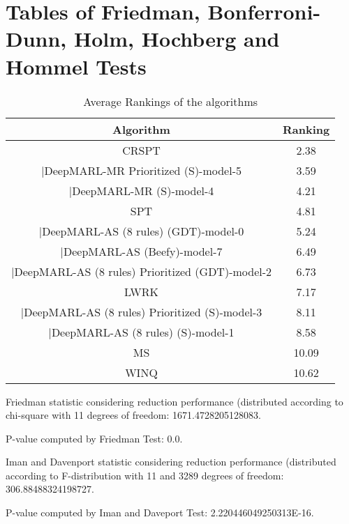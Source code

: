 \documentclass[a3paper,10pt]{article}
\author{}
\date{\today}
\begin{document}
\oddsidemargin 0in \topmargin 0in\maketitle
\section{Tables of Friedman, Bonferroni-Dunn, Holm, Hochberg and Hommel Tests}
\begin{table}[!htp]
\centering
\caption{Average Rankings of the algorithms
}\begin{tabular}{c|c}
Algorithm&Ranking\\
\hline
CRSPT&2.38\\
|DeepMARL-MR Prioritized (S)-model-5&3.59\\
|DeepMARL-MR (S)-model-4&4.21\\
SPT&4.81\\
|DeepMARL-AS (8 rules) (GDT)-model-0&5.24\\
|DeepMARL-AS (Beefy)-model-7&6.49\\
|DeepMARL-AS (8 rules) Prioritized (GDT)-model-2&6.73\\
LWRK&7.17\\
|DeepMARL-AS (8 rules) Prioritized (S)-model-3&8.11\\
|DeepMARL-AS (8 rules) (S)-model-1&8.58\\
MS&10.09\\
WINQ&10.62\\
\end{tabular}
\end{table}


Friedman statistic considering reduction performance (distributed according to chi-square with 11 degrees of freedom: 1671.4728205128083.


P-value computed by Friedman Test: 0.0.\newline

Iman and Davenport statistic considering reduction performance (distributed according to F-distribution with 11 and 3289 degrees of freedom: 306.88488324198727.


P-value computed by Iman and Daveport Test: 2.220446049250313E-16.\newline
\end{document}
